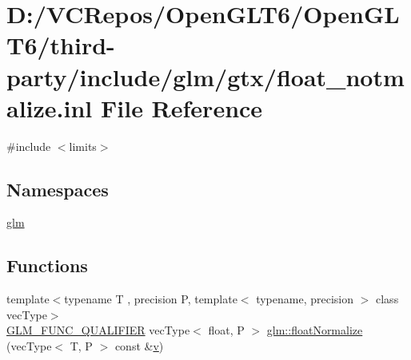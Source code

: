 \hypertarget{float__notmalize_8inl}{}\section{D\+:/\+V\+C\+Repos/\+Open\+G\+L\+T6/\+Open\+G\+L\+T6/third-\/party/include/glm/gtx/float\+\_\+notmalize.inl File Reference}
\label{float__notmalize_8inl}
{\ttfamily \#include $<$limits$>$}\newline
\subsection*{Namespaces}
\begin{DoxyCompactItemize}
\item 
 \mbox{\hyperlink{namespaceglm}{glm}}
\end{DoxyCompactItemize}
\subsection*{Functions}
\begin{DoxyCompactItemize}
\item 
{\footnotesize template$<$typename T , precision P, template$<$ typename, precision $>$ class vec\+Type$>$ }\\\mbox{\hyperlink{setup_8hpp_a33fdea6f91c5f834105f7415e2a64407}{G\+L\+M\+\_\+\+F\+U\+N\+C\+\_\+\+Q\+U\+A\+L\+I\+F\+I\+ER}} vec\+Type$<$ float, P $>$ \mbox{\hyperlink{namespaceglm_a80c8bce93497cd979506e61ce5c2ac0d}{glm\+::float\+Normalize}} (vec\+Type$<$ T, P $>$ const \&\mbox{\hyperlink{glad_8h_a14cfbe2fc2234f5504618905b69d1e06}{v}})
\end{DoxyCompactItemize}
